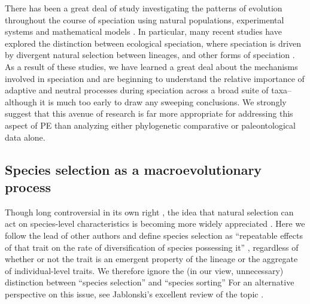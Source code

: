 There has been a great deal of study investigating the patterns of evolution throughout the course of speciation using natural populations, experimental systems and mathematical models \citep[][and references within]{Schluter2000, CoyneOrr, Gavrilets2004, Rundle2005, Doebeli2011, Nosil2012}.  In particular, many recent studies have explored the distinction between ecological speciation, where speciation is driven by divergent natural selection between lineages, and other forms of speciation \citep[e.g., Bateson-Dobzhansky-Muller incompatibilities, speciation driven by sexual selection, etc.; reviewed in ][]{Nosil2012}. As a result of these studies, we have learned a great deal about the mechanisms involved in speciation and are beginning to understand the relative importance of adaptive and neutral processes during speciation across a broad suite of taxa--although it is much too early to draw any sweeping conclusions. We strongly suggest that this avenue of research is far more appropriate for addressing this aspect of PE than analyzing either phylogenetic comparative or paleontological data alone. 

\subsection{Species selection as a macroevolutionary process}

Though long controversial in its own right \citep{FitzJohnthesis}, the idea that natural selection can act on species-level characteristics is becoming more widely appreciated \citep{CoyneOrr, Jablonski2008, RaboskyMcCune2010, FitzJohnthesis}. Here we follow the lead of other authors \citep{Williams1992, CoyneOrr, RaboskyMcCune2010} and define species selection as  ``repeatable effects of that trait on the rate of diversification of species possessing it'' \citep[][p. 444]{CoyneOrr}, regardless of whether or not the trait is an emergent property of the lineage or the aggregate of individual-level traits. We therefore ignore the (in our view, unnecessary) distinction between ``species selection'' and ``species sorting'' \citep[\textit{sensu}][]{GouldVrba1986} For an alternative perspective on this issue, see Jablonski's excellent review of the topic \citep{Jablonski2008}.

